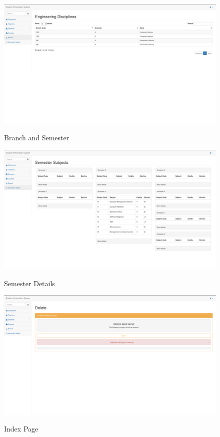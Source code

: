 \begin{figure}[H]
\centering
\caption{Branch and Semester}
\includegraphics[width=\textwidth,height=\textheight,keepaspectratio]{./snaps/9.png}
\\[0.2in]
\label{fig:Branch and Semester}
\end{figure}

\begin{figure}[H]
\centering
\caption{Semester Details}
\includegraphics[width=\textwidth,height=\textheight,keepaspectratio]{./snaps/10.png}
\\[0.2in]
\label{fig:Semester Details}
\end{figure}

\begin{figure}[H]
\centering
\caption{Index Page}
\includegraphics[width=\textwidth,height=\textheight,keepaspectratio]{./snaps/11.png}
\\[0.2in]
\label{fig:Index Page}
\end{figure}

